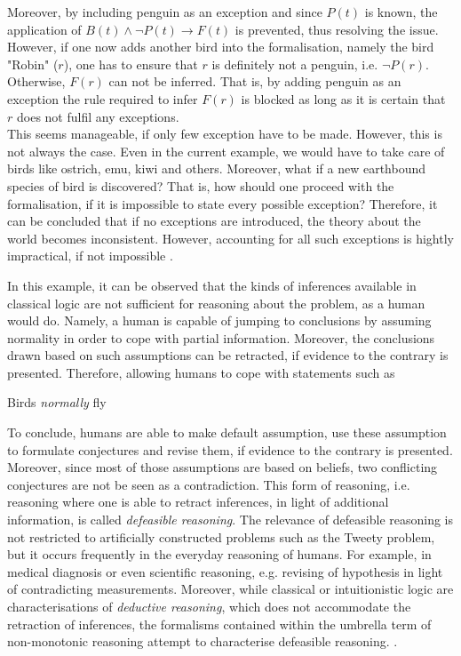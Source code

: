 \documentclass{article}
\begin{document}
\begin{prooftree} 
\end{prooftree}

Moreover, by including penguin as an exception and since $P(t)$ is known, the application of $B(t) \wedge \neg P(t) \to F(t)$ is prevented, thus resolving the issue. 
However, if one now adds another bird into the formalisation, namely the bird "Robin" ($r$), one has to ensure that $r$ is definitely not a penguin, i.e. $\neg P(r)$. Otherwise, $F(r)$ can not be inferred. That is, by adding penguin as an exception the rule required to infer $F(r)$ is blocked as long as it is certain that $r$ does not fulfil any exceptions. \\
This seems manageable, if only few exception have to be made. However, this is not always the case. Even in the current example, we would have to take care of birds like ostrich, emu, kiwi and others. Moreover, what if a new earthbound species of bird is discovered? That is, how should one proceed with the formalisation, if it is impossible to state every possible exception? Therefore, it can be concluded that if no exceptions are introduced, the theory about the world becomes inconsistent. However, accounting for all such exceptions is hightly impractical, if not impossible \cite{reiter1980logic,BOCHMAN2007557}.  \\ \linebreak

In this example, it can be observed that the kinds of inferences available in classical logic are not sufficient for reasoning about the problem, as a human would do. Namely, a human is capable of jumping to conclusions by assuming normality in order to cope with partial information. Moreover, the conclusions drawn based on such assumptions can be retracted, if evidence to the contrary is presented. Therefore, allowing humans to cope with statements such as 
\begin{center}
Birds \emph{normally} fly
\end{center}

To conclude, humans are able to make default assumption, use these assumption to formulate conjectures and revise them, if evidence to the contrary is presented. Moreover, since most of those assumptions are based on beliefs, two conflicting conjectures are not be seen as a contradiction. This form of reasoning, i.e. reasoning where one is able to retract inferences, in light of additional information, is called \emph{defeasible reasoning}. The relevance of defeasible reasoning is not restricted to artificially constructed problems such as the Tweety problem, but it occurs frequently in the everyday reasoning of humans. For example, in medical diagnosis or even scientific reasoning, e.g. revising of hypothesis in light of contradicting measurements. Moreover, while classical or intuitionistic logic are characterisations of \emph{deductive reasoning}, which does not accommodate the retraction of inferences, the formalisms contained within the umbrella term of non-monotonic reasoning attempt to characterise defeasible reasoning. \cite{reiter1980logic,BOCHMAN2007557,defeasible_stanford2018,nonmonoton_stanford2018}. 
\\
\end{document}

